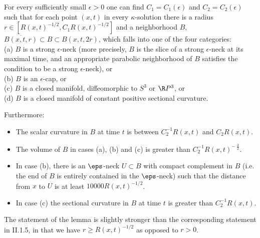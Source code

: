 \begin{lemma}
  \label{lem:kl-three-dimensional-solutions-existence-kappa-solutions-5}
 \label{nbhd}
For every sufficiently small $\epsilon > 0$ one can
find $C_1 = C_1(\epsilon)$ and $C_2 = C_2(\epsilon)$
such that for each point $(x, t)$ in every
$\kappa$-solution there is a radius
$r \in [ R(x,t)^{-1/2}, C_1 R(x,t)^{-1/2}]$ and a neighborhood
$B$,
$\overline{B(x,t,r)} \subset B \subset B(x,t,2r)$,
which falls into one
of the four categories: \\
(a) $B$ is a strong $\epsilon$-neck
(more precisely, $B$ is the slice of a
strong $\epsilon$-neck at its maximal time, and an appropriate parabolic
neighborhood of $B$
satisfies the condition to be a strong $\epsilon$-neck),
or \\
(b) $B$ is an $\epsilon$-cap, or \\
(c) $B$ is a closed manifold, diffeomorphic to $S^3$ or $\R P^3$, or\\
(d) $B$ is a closed manifold of constant positive sectional curvature.

Furthermore:

\begin{itemize}
\item The scalar curvature in $B$ at time $t$ is between
$C_2^{-1} R(x,t)$ and $C_2 R(x,t)$.

\item The volume of $B$ in cases (a), (b) and (c) is
greater than $C_2^{-1} R(x,t)^{- \: \frac32}$.

\item In case (b), there is an $\eps$-neck $U\subset B$ with compact complement in $B$
(i.e. the end of $B$ is entirely contained in the $\eps$-neck) such that the
distance from $x$ to $U$ is at least $10000R(x,t)^{-1/2}$.

\item In case (c) the
sectional curvature in $B$ at time $t$ is greater than $C_2^{-1} R(x,t)$.
\end{itemize}
\end{lemma}

\begin{remark}
  \label{rem:kl-three-dimensional-solutions-structural-remark-three-dimensional-solutions}

The statement of the lemma is slightly stronger than the corresponding
statement in II.1.5, in that
we have $r \ge  R(x,t)^{-1/2}$ as opposed to $r > 0$.
\end{remark}

